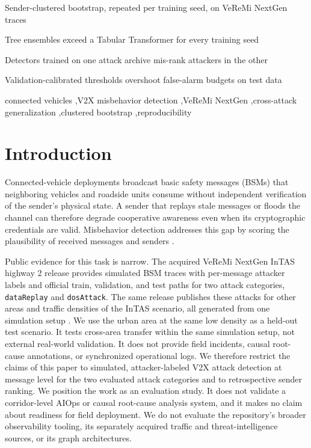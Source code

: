 \documentclass[preprint,12pt,numafflabel]{elsarticle}
\begin{document}
\begin{frontmatter}
\begin{highlights}
\item Sender-clustered bootstrap, repeated per training seed, on VeReMi NextGen traces
\item Tree ensembles exceed a Tabular Transformer for every training seed
\item Detectors trained on one attack archive mis-rank attackers in the other
\item Validation-calibrated thresholds overshoot false-alarm budgets on test data
\end{highlights}

\begin{keyword}
connected vehicles \sep V2X misbehavior detection \sep VeReMi NextGen \sep cross-attack generalization \sep clustered bootstrap \sep reproducibility
\end{keyword}

\end{frontmatter}

\section{Introduction}
Connected-vehicle deployments broadcast basic safety messages (BSMs) that neighboring vehicles and roadside units consume without independent verification of the sender's physical state. A sender that replays stale messages or floods the channel can therefore degrade cooperative awareness even when its cryptographic credentials are valid. Misbehavior detection addresses this gap by scoring the plausibility of received messages and senders \cite{vanderheijden2019survey}.

Public evidence for this task is narrow. The acquired VeReMi NextGen InTAS highway 2 release \cite{veremi2026} provides simulated BSM traces with per-message attacker labels and official train, validation, and test paths for two attack categories, \texttt{dataReplay} and \texttt{dosAttack}. The same release publishes these attacks for other areas and traffic densities of the InTAS scenario, all generated from one simulation setup \cite{hermann2026veremi}. We use the urban area at the same low density as a held-out test scenario. It tests cross-area transfer within the same simulation setup, not external real-world validation. It does not provide field incidents, causal root-cause annotations, or synchronized operational logs. We therefore restrict the claims of this paper to simulated, attacker-labeled V2X attack detection at message level for the two evaluated attack categories and to retrospective sender ranking. We position the work as an evaluation study. It does not validate a corridor-level AIOps or causal root-cause analysis system, and it makes no claim about readiness for field deployment. We do not evaluate the repository's broader observability tooling, its separately acquired traffic and threat-intelligence sources, or its graph architectures.
\end{document}
